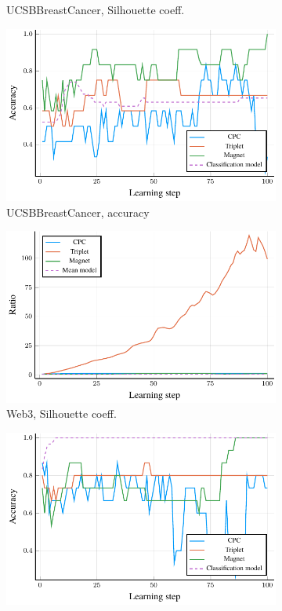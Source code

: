 \begin{figure}
\begin{subfigure}[t]{0.49\textwidth}
    \caption{UCSBBreastCancer, Silhouette coeff.}
  \end{subfigure}
  \begin{subfigure}[t]{0.49\textwidth}
    \centering
    \includegraphics[width=\textwidth]{images/UCSBBreastCancer_accuracy/UCSBBreastCancer_accuracy.pdf}
    \caption{UCSBBreastCancer, accuracy}
  \end{subfigure}
  \begin{subfigure}[t]{0.49\textwidth}
    \centering
    \includegraphics[width=\textwidth]{images/Web3_ratio/Web3_ratio.pdf}
    \caption{Web3, Silhouette coeff.}
  \end{subfigure}
  \begin{subfigure}[t]{0.49\textwidth}
    \centering
    \includegraphics[width=\textwidth]{images/Web3_accuracy/Web3_accuracy.pdf}

\end{subfigure}
\end{figure}
